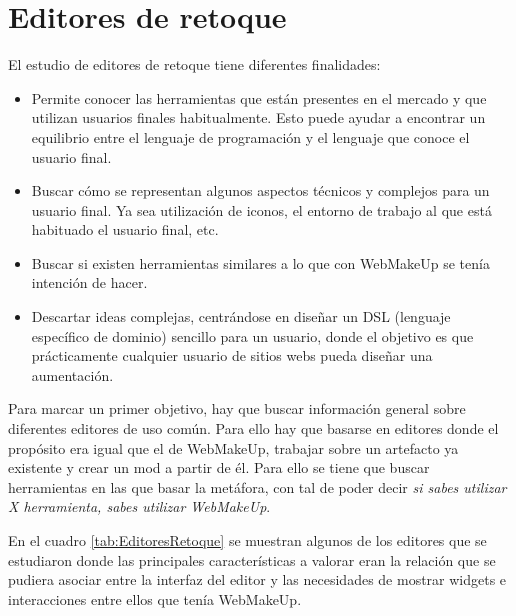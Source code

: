 \section{Editores de retoque}
\label{sec:editoresRetoque}

El estudio de editores de retoque tiene diferentes finalidades:
\begin{itemize}
\item{Permite conocer las herramientas que están presentes en el mercado y que utilizan usuarios finales habitualmente. Esto puede ayudar a encontrar un equilibrio entre el lenguaje de programación y el lenguaje que conoce el usuario final.}
\item{Buscar cómo se representan algunos aspectos técnicos y complejos para un usuario final. Ya sea utilización de iconos, el entorno de trabajo al que está habituado el usuario final, etc.}
\item{Buscar si existen herramientas similares a lo que con WebMakeUp se tenía intención de hacer.}
\item{Descartar ideas complejas, centrándose en diseñar un DSL (lenguaje específico de dominio) sencillo para un usuario, donde el objetivo es que prácticamente cualquier usuario de sitios webs pueda diseñar una aumentación.}
\end{itemize}

Para marcar un primer objetivo, hay que buscar información general sobre diferentes editores de uso común. Para ello hay que basarse en editores donde el propósito era igual que el de WebMakeUp, trabajar sobre un artefacto ya existente y crear un mod a partir de él. Para ello se tiene que buscar herramientas en las que basar la metáfora, con tal de poder decir \emph{si sabes utilizar X herramienta, sabes utilizar WebMakeUp}.

En el cuadro \ref{tab:EditoresRetoque} se muestran algunos de los editores que se estudiaron donde las principales características a valorar eran la relación que se pudiera asociar entre la interfaz del editor y las necesidades de mostrar widgets e interacciones entre ellos que tenía WebMakeUp.

